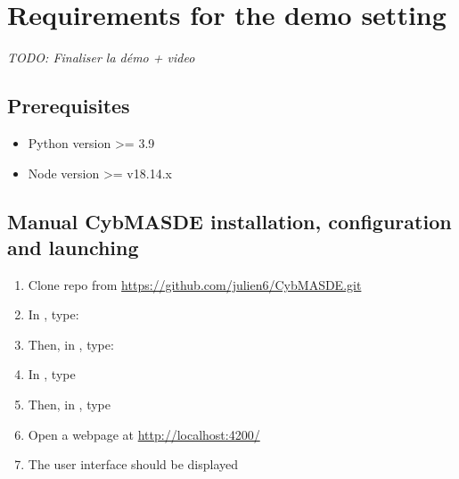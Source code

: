 \documentclass[sigconf]{aamas}
\begin{document}



\newpage

 



\newpage
\phantom{ }
\newpage

\section*{Requirements for the demo setting}

\textit{TODO: Finaliser la démo + video}

\subsection*{Prerequisites}

\begin{itemize}
  \item Python version >= 3.9
  \item Node version >= v18.14.x
\end{itemize}

  
\subsection*{Manual CybMASDE installation, configuration and launching}

\begin{enumerate}
  \item Clone repo from \url{https://github.com/julien6/CybMASDE.git}
  \item In , type: 
  \item Then, in , type: 
  \item In , type 
  \item Then, in , type 
  \item Open a webpage at \url{http://localhost:4200/}
  \item The user interface should be displayed
\end{enumerate}
\end{document}
